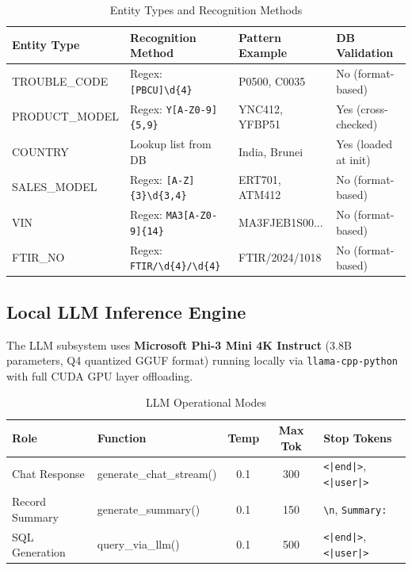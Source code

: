\documentclass[12pt, a4paper, twoside]{article}
\begin{document}
\begin{table}[H]
\centering
\caption{Entity Types and Recognition Methods}
\label{tab:ner}
\begin{tabularx}{\textwidth}{L{2.5cm} L{3.5cm} L{2.5cm} X}
\toprule
{}\color{white}\textbf{Entity Type} & \color{white}\textbf{Recognition Method} & \color{white}\textbf{Pattern Example} & \color{white}\textbf{DB Validation} \\
\midrule
TROUBLE\_CODE & Regex: \texttt{[PBCU]\textbackslash d\{4\}} & P0500, C0035 & No (format-based) \\
PRODUCT\_MODEL & Regex: \texttt{Y[A-Z0-9]\{5,9\}} & YNC412, YFBP51 & Yes (cross-checked) \\
COUNTRY & Lookup list from DB & India, Brunei & Yes (loaded at init) \\
SALES\_MODEL & Regex: \texttt{[A-Z]\{3\}\textbackslash d\{3,4\}} & ERT701, ATM412 & No (format-based) \\
VIN & Regex: \texttt{MA3[A-Z0-9]\{14\}} & MA3FJEB1S00... & No (format-based) \\
FTIR\_NO & Regex: \texttt{FTIR/\textbackslash d\{4\}/\textbackslash d\{4\}} & FTIR/2024/1018 & No (format-based) \\
\bottomrule
\end{tabularx}
\end{table}

\subsection{Local LLM Inference Engine}

The LLM subsystem uses \textbf{Microsoft Phi-3 Mini 4K Instruct} (3.8B parameters, Q4 quantized GGUF format) running locally via \texttt{llama-cpp-python} with full CUDA GPU layer offloading.

\begin{table}[H]
\centering
\caption{LLM Operational Modes}
\label{tab:llm-modes}
\begin{tabularx}{\textwidth}{L{2.5cm} L{3cm} c c L{3.5cm}}
\toprule
{}\color{white}\textbf{Role} & \color{white}\textbf{Function} & \color{white}\textbf{Temp} & \color{white}\textbf{Max Tok} & \color{white}\textbf{Stop Tokens} \\
\midrule
Chat Response & generate\_chat\_stream() & 0.1 & 300 & \texttt{<|end|>}, \texttt{<|user|>} \\
Record Summary & generate\_summary() & 0.1 & 150 & \texttt{\textbackslash n}, \texttt{Summary:} \\
SQL Generation & query\_via\_llm() & 0.1 & 500 & \texttt{<|end|>}, \texttt{<|user|>} \\
\bottomrule
\end{tabularx}
\end{table}
\end{document}
